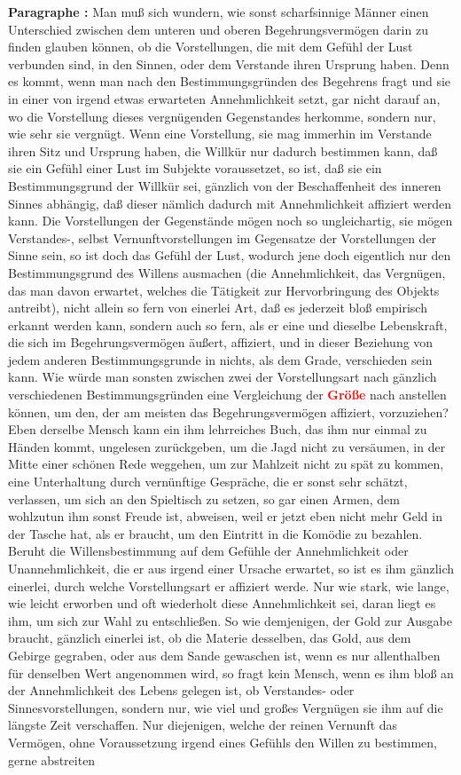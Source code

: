 \documentclass[a4paper,12pt,twoside]{book}
\newcommand{\match}[1]{\textcolor{red}{\textbf{#1}}}
\begin{document}
	\noindent\textbf{Paragraphe : }Man muß sich wundern, wie sonst scharfsinnige Männer einen Unterschied zwischen dem unteren und oberen Begehrungsvermögen darin zu finden glauben können, ob die Vorstellungen, die mit dem Gefühl der Lust verbunden sind, in den Sinnen, oder dem Verstande ihren Ursprung haben. Denn es kommt, wenn man nach den Bestimmungsgründen des Begehrens fragt und sie in einer von irgend etwas erwarteten Annehmlichkeit setzt, gar nicht darauf an, wo die Vorstellung dieses vergnügenden Gegenstandes herkomme, sondern nur, wie sehr sie vergnügt. Wenn eine Vorstellung, sie mag immerhin im Verstande ihren Sitz und Ursprung haben, die Willkür nur dadurch bestimmen  kann, daß sie ein Gefühl einer Lust im Subjekte voraussetzet, so ist, daß sie ein Bestimmungsgrund der Willkür sei, gänzlich von der Beschaffenheit des inneren Sinnes abhängig, daß dieser nämlich dadurch mit Annehmlichkeit affiziert werden kann. Die Vorstellungen der Gegenstände mögen noch so ungleichartig, sie mögen Verstandes-, selbst Vernunftvorstellungen im Gegensatze der Vorstellungen der Sinne sein, so ist doch das Gefühl der Lust, wodurch jene doch eigentlich nur den Bestimmungsgrund des Willens ausmachen (die Annehmlichkeit, das Vergnügen, das man davon erwartet, welches die Tätigkeit zur Hervorbringung des Objekts antreibt), nicht allein so fern von einerlei Art, daß es jederzeit bloß empirisch erkannt werden kann, sondern auch so fern, als er eine und dieselbe Lebenskraft, die sich im Begehrungsvermögen äußert, affiziert, und in dieser Beziehung von jedem anderen Bestimmungsgrunde in nichts, als dem Grade, verschieden sein kann. Wie würde man sonsten zwischen zwei der Vorstellungsart nach gänzlich verschiedenen Bestimmungsgründen eine Vergleichung der \match{Größe} nach anstellen können, um den, der am meisten das Begehrungsvermögen affiziert, vorzuziehen? Eben derselbe Mensch kann ein ihm lehrreiches Buch, das ihm nur einmal zu Händen kommt, ungelesen zurückgeben, um die Jagd nicht zu versäumen, in der Mitte einer schönen Rede weggehen, um zur Mahlzeit nicht zu spät zu kommen, eine Unterhaltung durch vernünftige Gespräche, die er sonst sehr schätzt, verlassen, um sich an den Spieltisch zu setzen, so gar einen Armen, dem wohlzutun ihm sonst Freude ist, abweisen, weil er jetzt eben nicht mehr Geld in der Tasche hat, als er braucht, um den Eintritt in die Komödie zu bezahlen. Beruht die Willensbestimmung auf dem Gefühle der Annehmlichkeit oder Unannehmlichkeit, die er aus irgend einer Ursache erwartet, so ist es ihm gänzlich einerlei, durch welche Vorstellungsart er affiziert werde. Nur wie stark, wie lange, wie leicht erworben und oft wiederholt diese Annehmlichkeit sei, daran liegt es ihm, um sich zur Wahl zu entschließen. So wie demjenigen, der Gold zur Ausgabe  braucht, gänzlich einerlei ist, ob die Materie desselben, das Gold, aus dem Gebirge gegraben, oder aus dem Sande gewaschen ist, wenn es nur allenthalben für denselben Wert angenommen wird, so fragt kein Mensch, wenn es ihm bloß an der Annehmlichkeit des Lebens gelegen ist, ob Verstandes- oder Sinnesvorstellungen, sondern nur, wie viel und großes Vergnügen sie ihm auf die längste Zeit verschaffen. Nur diejenigen, welche der reinen Vernunft das Vermögen, ohne Voraussetzung irgend eines Gefühls den Willen zu bestimmen, gerne abstreiten 
\end{document}
